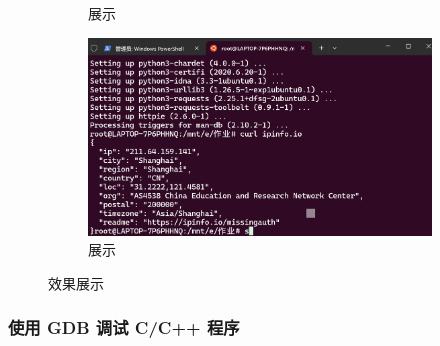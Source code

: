 \documentclass[UTF8]{ctexart}
\begin{document}
\begin{enumerate}
\begin{itemize}
\begin{figure}[H]
\begin{subfigure}[t]{0.32\textwidth}
        \caption{展示}
    \end{subfigure}%
    \hfill
    \begin{subfigure}[t]{0.32\textwidth}
        \centering
        \includegraphics[width=\textwidth]{153} %
        \caption{展示}
    \end{subfigure}
    \caption{效果展示}
\end{figure}

  \end{itemize}
\end{enumerate}

\subsubsection{使用 GDB 调试 C/C++ 程序}
\end{document}
